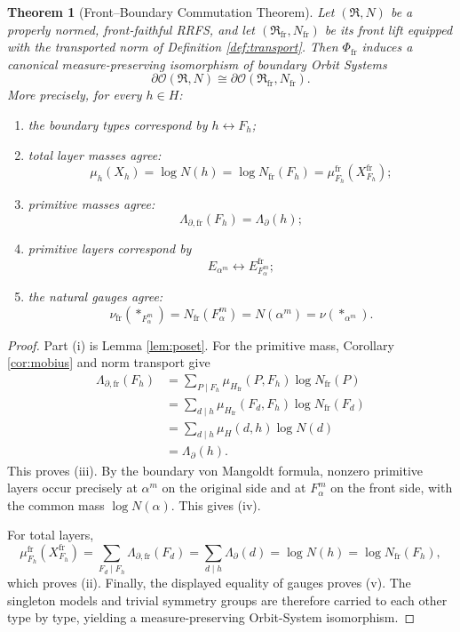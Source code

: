 \documentclass[11pt]{article}
\newcommand{\cR}{\mathfrak R}
\newcommand{\cO}{\mathcal O}
\newcommand{\fr}{\mathrm{fr}}
\newcommand{\bd}{\partial}
\newcommand{\Lam}{\Lambda}
\newcommand{\Mob}{\mu}
\newcommand{\Div}{\mid}
\newtheorem{theorem}{Theorem}[section]
\begin{document}
\begin{theorem}[Front--Boundary Commutation Theorem]\label{thm:main}
Let $(\cR,N)$ be a properly normed, front-faithful RRFS, and let $(\cR_{\fr},N_{\fr})$ be its front lift equipped with the transported norm of Definition \ref{def:transport}. Then $\Phi_{\fr}$ induces a canonical measure-preserving isomorphism of boundary Orbit Systems
\[
\boxed{
\bd\cO(\cR,N)
\cong
\bd\cO(\cR_{\fr},N_{\fr}).}
\]
More precisely, for every $h\in H$:
\begin{enumerate}[label=(\roman*)]
\item the boundary types correspond by $h\leftrightarrow F_h$;
\item total layer masses agree:
\[
\mu_h(X_h)=\log N(h)
=\log N_{\fr}(F_h)
=\mu^{\fr}_{F_h}(X^{\fr}_{F_h});
\]
\item primitive masses agree:
\[
\boxed{\Lam_{\bd,\fr}(F_h)=\Lam_{\bd}(h);}
\]
\item primitive layers correspond by
\[
E_{\alpha^m}\longleftrightarrow E^{\fr}_{F_\alpha^m};
\]
\item the natural gauges agree:
\[
\nu_{\fr}(\ast_{F_\alpha^m})
=N_{\fr}(F_\alpha^m)
=N(\alpha^m)
=\nu(\ast_{\alpha^m}).
\]
\end{enumerate}
\end{theorem}

\begin{proof}
Part (i) is Lemma \ref{lem:poset}. For the primitive mass, Corollary \ref{cor:mobius} and norm transport give
\[
\begin{aligned}
\Lam_{\bd,\fr}(F_h)
&=
\sum_{P\Div F_h}
\Mob_{H_{\fr}}(P,F_h)\log N_{\fr}(P)\\
&=
\sum_{d\Div h}
\Mob_{H_{\fr}}(F_d,F_h)\log N_{\fr}(F_d)\\
&=
\sum_{d\Div h}
\Mob_H(d,h)\log N(d)\\
&=
\Lam_{\bd}(h).
\end{aligned}
\]
This proves (iii). By the boundary von Mangoldt formula, nonzero primitive layers occur precisely at $\alpha^m$ on the original side and at $F_\alpha^m$ on the front side, with the common mass $\log N(\alpha)$. This gives (iv).

For total layers,
\[
\mu^{\fr}_{F_h}(X^{\fr}_{F_h})
=
\sum_{F_d\Div F_h}\Lam_{\bd,\fr}(F_d)
=
\sum_{d\Div h}\Lam_{\bd}(d)
=
\log N(h)
=
\log N_{\fr}(F_h),
\]
which proves (ii). Finally, the displayed equality of gauges proves (v). The singleton models and trivial symmetry groups are therefore carried to each other type by type, yielding a measure-preserving Orbit-System isomorphism.
\end{proof}
\end{document}

